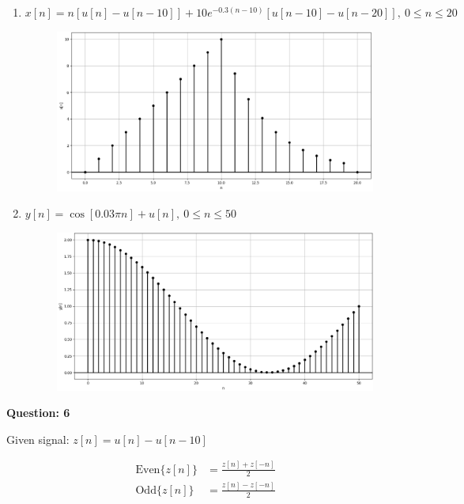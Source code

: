 \documentclass{article}
\begin{document}
    \begin{enumerate}

        \item $x[n] = n[u[n] - u[n-10]] + 10e^{-0.3(n-10)}[u[n-10] - u[n-20]],\ 0 \leq n \leq 20$
        \begin{figure}[h]
            \centering
            \includegraphics[scale=0.39]{./Assets/solution-5-i.png}
        \end{figure}

        \item $y[n] = \cos{[0.03 \pi n]} + u[n],\ 0 \leq n \leq 50$
        \begin{figure}[h]
            \centering
            \includegraphics[scale=0.39]{./Assets/solution-5-ii.png}
        \end{figure}

    \end{enumerate}

    \textbf{Question: 6}

    Given signal: $z[n] = u[n] - u[n-10]$

    \begin{align}
        \text{Even}\{z[n]\} &= \frac{z[n] + z[-n]}{2} \\
        \text{Odd}\{z[n]\} &= \frac{z[n] - z[-n]}{2}
    \end{align}
\end{document}
